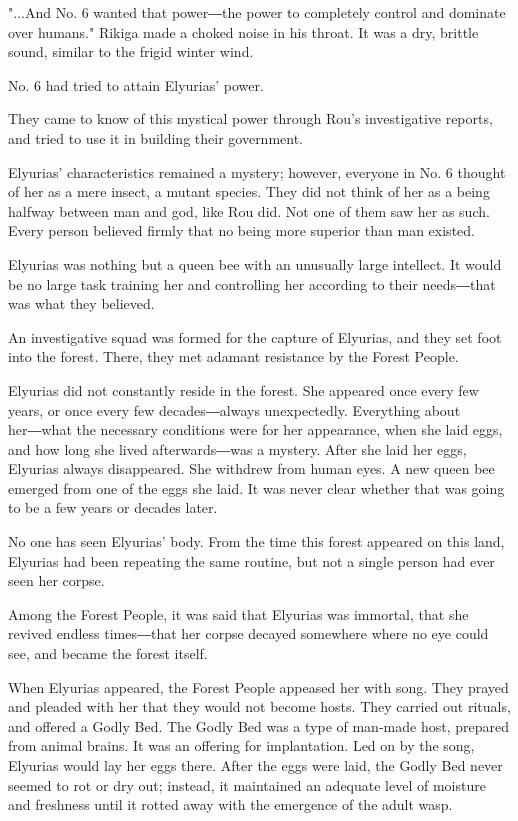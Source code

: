 "...And No. 6 wanted that power―the power to completely control and
dominate over humans." Rikiga made a choked noise in his throat. It was
a dry, brittle sound, similar to the frigid winter wind.

No. 6 had tried to attain Elyurias' power.

They came to know of this mystical power through Rou's investigative
reports, and tried to use it in building their government.

Elyurias' characteristics remained a mystery; however, everyone in No. 6
thought of her as a mere insect, a mutant species. They did not think of
her as a being halfway between man and god, like Rou did. Not one of
them saw her as such. Every person believed firmly that no being more
superior than man existed.

Elyurias was nothing but a queen bee with an unusually large intellect.
It would be no large task training her and controlling her according to
their needs―that was what they believed.

An investigative squad was formed for the capture of Elyurias, and they
set foot into the forest. There, they met adamant resistance by the
Forest People.

Elyurias did not constantly reside in the forest. She appeared once
every few years, or once every few decades―always unexpectedly.
Everything about her―what the necessary conditions were for her
appearance, when she laid eggs, and how long she lived afterwards―was a
mystery. After she laid her eggs, Elyurias always disappeared. She
withdrew from human eyes. A new queen bee emerged from one of the eggs
she laid. It was never clear whether that was going to be a few years or
decades later.

No one has seen Elyurias' body. From the time this forest appeared on
this land, Elyurias had been repeating the same routine, but not a
single person had ever seen her corpse.

Among the Forest People, it was said that Elyurias was immortal, that
she revived endless times―that her corpse decayed somewhere where no eye
could see, and became the forest itself.

When Elyurias appeared, the Forest People appeased her with song. They
prayed and pleaded with her that they would not become hosts. They
carried out rituals, and offered a Godly Bed. The Godly Bed was a type
of man-made host, prepared from animal brains. It was an offering for
implantation. Led on by the song, Elyurias would lay her eggs there.
After the eggs were laid, the Godly Bed never seemed to rot or dry out;
instead, it maintained an adequate level of moisture and freshness until
it rotted away with the emergence of the adult wasp.


